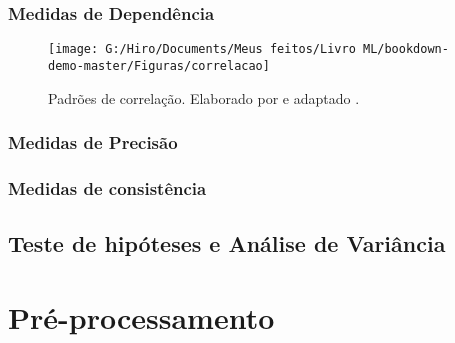 \documentclass[
]{book}
\begin{document}
\hypertarget{medidasdep}{%
\subsection{Medidas de Dependência}\label{medidasdep}}

\begin{figure}

{\centering \texttt{[image: G:/Hiro/Documents/Meus feitos/Livro ML/bookdown-demo-master/Figuras/correlacao]} 

}

\caption{Padrões de correlação. Elaborado por \citet{gujarati2011econometria} e adaptado \citet{theil1978}.}\label{fig:correlacao}
\end{figure}



\hypertarget{medidas-de-precisuxe3o}{%
\subsection{Medidas de Precisão}\label{medidas-de-precisuxe3o}}

\hypertarget{medidas-de-consistuxeancia}{%
\subsection{Medidas de consistência}\label{medidas-de-consistuxeancia}}

\hypertarget{testesanova}{%
\section{Teste de hipóteses e Análise de Variância}\label{testesanova}}

\hypertarget{preprocesso}{%
\chapter{Pré-processamento}\label{preprocesso}}
\end{document}
